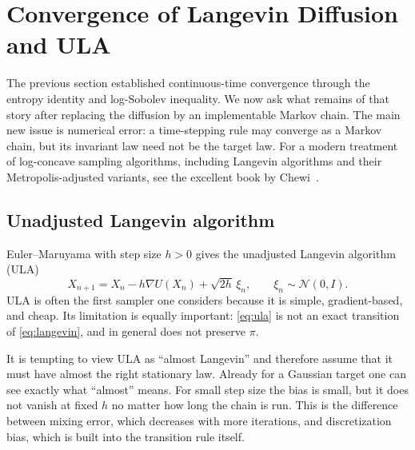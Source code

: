 \documentclass{amsart}
\numberwithin{equation}{section}
\theoremstyle{plain}
\theoremstyle{definition}
\theoremstyle{remark}
\newcommand{\Id}{I}
\newcommand{\normal}[2]{\mathcal{N}\!\left(#1,#2\right)}
\begin{document}
\section{Convergence of Langevin Diffusion and ULA}

The previous section established continuous-time convergence through the entropy identity and log-Sobolev inequality.  We now ask what remains of that story after replacing the diffusion by an implementable Markov chain.  The main new issue is numerical error: a time-stepping rule may converge as a Markov chain, but its invariant law need not be the target law.  For a modern treatment of log-concave sampling algorithms, including Langevin algorithms and their Metropolis-adjusted variants, see the excellent book by Chewi~\cite{chewi2024logconcave}.

\subsection{Unadjusted Langevin algorithm}

Euler--Maruyama with step size $h>0$ gives the unadjusted Langevin algorithm (ULA)
\begin{equation}\label{eq:ula}
    X_{n+1}=X_n-h\nabla U(X_n)+\sqrt{2h}\,\xi_n,
    \qquad \xi_n\sim\normal{0}{\Id}.
\end{equation}
ULA is often the first sampler one considers because it is simple, gradient-based, and cheap.  Its limitation is equally important: \eqref{eq:ula} is not an exact transition of \eqref{eq:langevin}, and in general does not preserve $\pi$.

It is tempting to view ULA as ``almost Langevin'' and therefore assume that it must have almost the right stationary law.  Already for a Gaussian target one can see exactly what ``almost'' means.  For small step size the bias is small, but it does not vanish at fixed $h$ no matter how long the chain is run.  This is the difference between mixing error, which decreases with more iterations, and discretization bias, which is built into the transition rule itself.
\end{document}
